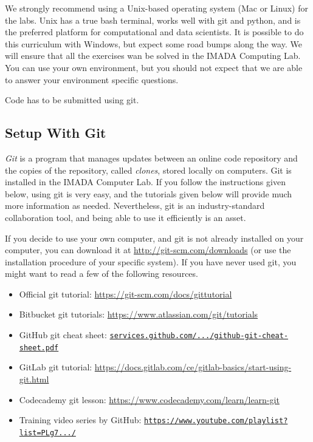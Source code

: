 \begin{warn}
We strongly recommend using a Unix-based operating system (Mac or Linux) for the labs.
Unix has a true bash terminal, works well with git and python, and is the preferred platform for computational and data scientists.
It is possible to do this curriculum with Windows, but expect some road bumps along the way. We will ensure that all the exercises wan be solved in the IMADA Computing Lab. You can use your own environment, but you should not expect that we are able to answer your environment specific questions.
\end{warn}

Code has to be submitted using git. 

\subsection*{Setup With Git} %

\emph{Git} is a program that manages updates between an online code repository and the copies of the repository, called \emph{clones}, stored locally on computers. Git is installed in the IMADA Computer Lab. If you follow the instructions given below, using git is very easy, and the tutorials given below will provide much more information as needed. Nevertheless, git is an industry-standard collaboration tool, and being able to use it efficiently is an asset.

If you decide to use your own computer, and git is not already installed on your computer, you can download it at \url{http://git-scm.com/downloads} (or use the installation procedure of your specific system).
If you have never used git, you might want to read a few of the following resources.
\begin{itemize}
\item Official git tutorial: \url{https://git-scm.com/docs/gittutorial}
\item Bitbucket git tutorials: \url{https://www.atlassian.com/git/tutorials}
\item GitHub git cheat sheet: \href{https://services.github.com/on-demand/downloads/github-git-cheat-sheet.pdf}{\texttt{services.github.com/.../github-git-cheat-sheet.pdf}}
\item GitLab git tutorial: \url{https://docs.gitlab.com/ce/gitlab-basics/start-using-git.html}
\item Codecademy git lesson: \url{https://www.codecademy.com/learn/learn-git}
\item Training video series by GitHub: \href{https://www.youtube.com/playlist?list=PLg7s6cbtAD15G8lNyoaYDuKZSKyJrgwB-}{\texttt{https://www.youtube.com/playlist?list=PLg7.../}}
\end{itemize}

